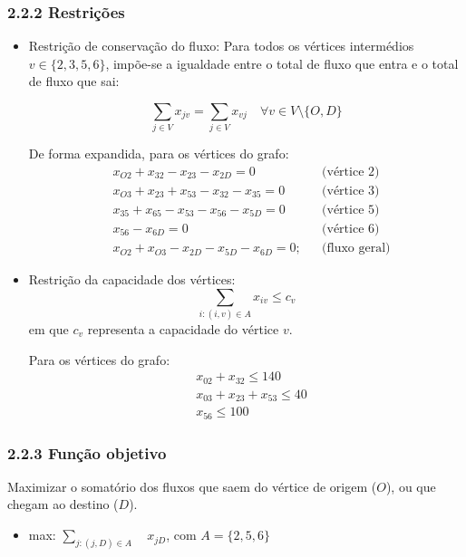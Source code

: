 \documentclass[a4paper,12pt]{article}
\begin{document}
\subsubsection*{2.2.2 Restrições}
\begin{itemize}
    \item Restrição de conservação do fluxo: Para todos os vértices intermédios \( v \in \{2, 3, 5, 6\} \), impõe-se a igualdade entre o total de fluxo que entra e o total de fluxo que sai:

\[
\sum_{j \in V} x_{jv} = \sum_{j \in V} x_{vj} \quad \forall v \in V \setminus \{O, D\}
\]

    De forma expandida, para os vértices do grafo:
        \begin{align*}
            &x_{O2} + x_{32} - x_{23} - x_{2D} = 0 && \text{(vértice 2)} \\
            &x_{O3} + x_{23} + x_{53} - x_{32} - x_{35} = 0 && \text{(vértice 3)} \\
            &x_{35} + x_{65} - x_{53} - x_{56} - x_{5D} = 0 && \text{(vértice 5)} \\
            &x_{56} - x_{6D} = 0 && \text{(vértice 6)} \\
            &x_{O2} + x_{O3} - x_{2D} - x_{5D} - x_{6D} = 0; && \text{(fluxo geral)}
        \end{align*}
    \item Restrição da capacidade dos vértices: 
\[
\sum_{i : (i,v) \in A} x_{iv} \leq c_v
\]em que $c_{v}$ representa a capacidade do vértice $v$.

    Para os vértices do grafo:
        \begin{align*}
            &x_{02} + x_{32} \leq 140 \\
            &x_{03} + x_{23} + x_{53} \leq 40 \\
            &x_{56} \leq 100
        \end{align*}
\end{itemize}

\subsubsection*{2.2.3 Função objetivo}
Maximizar o somatório dos fluxos que saem do vértice de origem ($O$), ou que chegam ao destino ($D$).
\begin{itemize}
    \item max: $\sum_{j : (j, D) \in A} \quad x_{jD}$, com $A = \{2,5,6\}$
\end{itemize}
\end{document}
